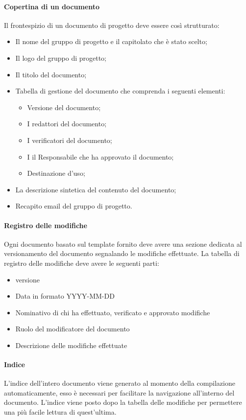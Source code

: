 \paragraph{Copertina di un documento}
Il frontespizio di un documento di progetto deve essere così strutturato:
\begin{itemize}
  \item Il nome del gruppo di progetto e il capitolato che è stato scelto;
  \item Il logo del gruppo di progetto;
  \item Il titolo del documento;
  \item Tabella di gestione del documento che comprenda i seguenti elementi:
  \begin{itemize}
    \item Versione del documento;
    \item I redattori del documento;
    \item I verificatori del documento;
    \item I il Responsabile che ha approvato il documento;
    \item Destinazione d'uso;
  \end{itemize}
  \item La descrizione sintetica del contenuto del documento;
  \item Recapito email del gruppo di progetto.
\end{itemize}
\paragraph{Registro delle modifiche}
Ogni documento basato sul template fornito deve avere una sezione dedicata al versionamento
del documento segnalando le modifiche effettuate.
La tabella di registro delle modifiche deve avere le seguenti parti:
\begin{itemize}
  \item versione
  \item Data in formato YYYY-MM-DD
  \item Nominativo di chi ha effettuato, verificato e approvato modifiche
  \item Ruolo del modificatore del documento
  \item Descrizione delle modifiche effettuate
\end{itemize}
\paragraph{Indice}
L'indice dell'intero documento viene generato al momento della compilazione
automaticamente, esso è necessari per facilitare la navigazione all'interno del
documento.
L'indice viene posto dopo la tabella delle modifiche per permettere una più facile
lettura di quest'ultima.
